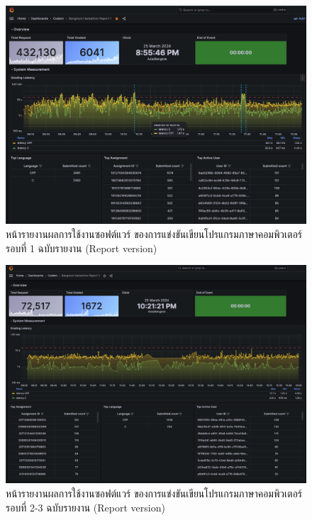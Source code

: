 \documentclass[12pt,one side,openright,a4paper]{cpe-thesis-th}
\begin{document}
\begin{figure}[H]
    \centering
    \includegraphics[width=12cm]{figure/results/grafana/grafana-bmh1-report.png}
    \caption[หน้ารายงานผลการใช้งานซอฟต์แวร์ ของการแข่งขันเขียนโปรแกรมภาษาคอมพิวเตอร์รอบที่ 1 ฉบับรายงาน]{หน้ารายงานผลการใช้งานซอฟต์แวร์ ของการแข่งขันเขียนโปรแกรมภาษาคอมพิวเตอร์รอบที่ 1 ฉบับรายงาน (Report version)}
    \label{fig:res-grafana-bmh1-report}
\end{figure}

\begin{figure}[H]
    \centering
    \includegraphics[width=12cm]{figure/results/grafana/grafana-bmh2-report.png}
    \caption[หน้ารายงานผลการใช้งานซอฟต์แวร์ ของการแข่งขันเขียนโปรแกรมภาษาคอมพิวเตอร์รอบที่ 2-3 ฉบับรายงาน]{หน้ารายงานผลการใช้งานซอฟต์แวร์ ของการแข่งขันเขียนโปรแกรมภาษาคอมพิวเตอร์รอบที่ 2-3 ฉบับรายงาน (Report version)}
    \label{fig:res-grafana-bmh2-report}
\end{figure}
\end{document}
